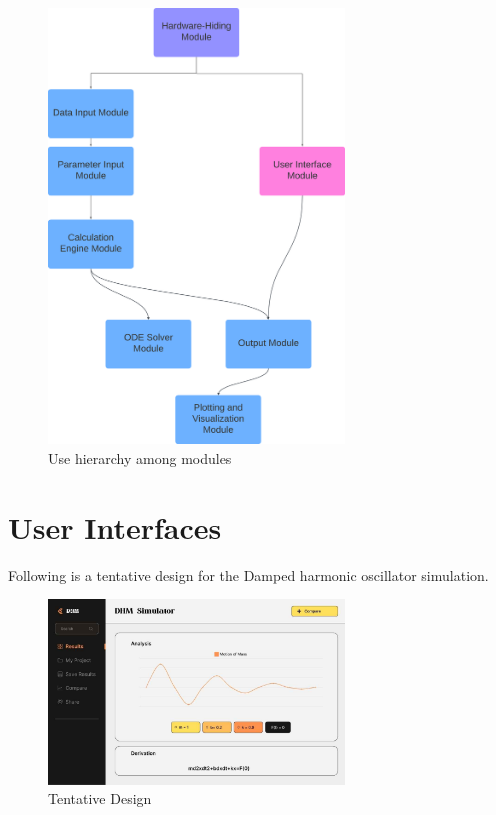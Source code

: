 \documentclass[12pt, titlepage]{article}
\begin{document}
\begin{figure}[h!]
\centering
\includegraphics[width=0.7\textwidth]{hierarchy.png}
\caption{Use hierarchy among modules}
\label{FigUH}
\end{figure}

\section{User Interfaces}

Following is a tentative design for the Damped harmonic oscillator simulation.

\begin{figure}[h!]
  \centering
  \includegraphics[width=0.7\textwidth]{UI.jpg}
  \caption{Tentative Design}
  \label{FigUI}
\end{figure}
\end{document}
